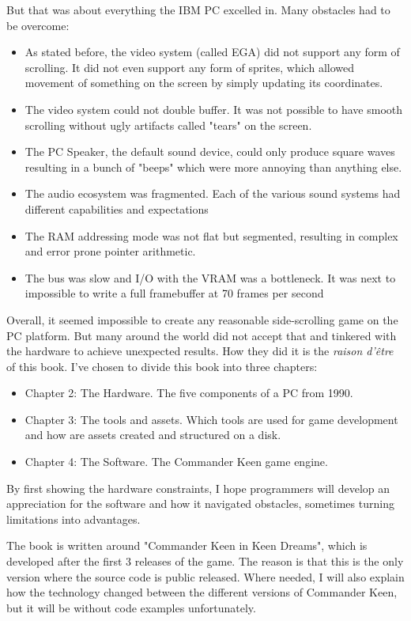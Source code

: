 \documentclass[book.tex]{subfiles}
\begin{document}
But that was about everything the IBM PC excelled in. Many obstacles had to be overcome:
\begin{itemize}
  \item As stated before, the video system (called EGA) did not support any form of scrolling. It did not even support any form of sprites, which allowed movement of something on the screen by simply updating its  coordinates.
  \item The video system could not double buffer. It was not possible to have smooth scrolling without ugly artifacts called "tears" on the screen.
  \item The PC Speaker, the default sound device, could only produce square waves resulting in a bunch of "beeps" which were more annoying than anything else.
  \item The audio ecosystem was fragmented. Each of the various sound systems had
different capabilities and expectations
  \item The RAM addressing mode was not flat but segmented, resulting in complex and
error prone pointer arithmetic.
  \item The bus was slow and I/O with the VRAM was a bottleneck. It was next to impossible to write a full framebuffer at 70 frames per second
\end{itemize}
Overall, it seemed impossible to create any reasonable side-scrolling game on the PC platform. But many around the world did not accept that and tinkered with the hardware to achieve unexpected results. How they did it is the \textit{raison d'\^etre} of this book. I've chosen to divide this book into three chapters:
\begin{itemize}
  \item Chapter 2: The Hardware. The five components of a PC from 1990.
  \item Chapter 3: The tools and assets. Which tools are used for game development and how are assets created and structured on a disk.
  \item Chapter 4: The Software. The Commander Keen game engine.
\end{itemize}
By first showing the hardware constraints, I hope programmers will develop an appreciation for the software and how it navigated obstacles, sometimes turning limitations into advantages.\\
\par
The book is written around "Commander Keen in Keen Dreams", which is developed after the first 3 releases of the game. The reason is that this is the only version where the source code is public released. Where needed, I will also explain how the technology changed between the different versions of Commander Keen, but it will be without code examples unfortunately.\\
\end{document}
